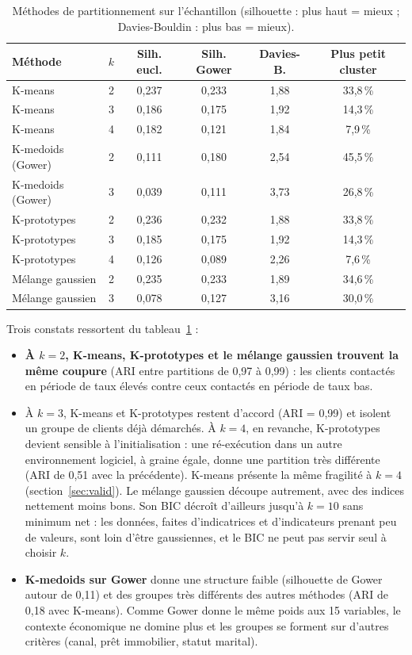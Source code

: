 \documentclass[11pt,a4paper]{article}
\begin{document}
\begin{table}[H]\centering\small
\caption{Méthodes de partitionnement sur l'échantillon (silhouette : plus haut = mieux ; Davies-Bouldin : plus bas = mieux).}\label{tab:partition}
\begin{tabular}{|l|c|c|c|c|c|}
\hline
\textbf{Méthode} & $k$ & \textbf{Silh. eucl.} & \textbf{Silh. Gower} & \textbf{Davies-B.} & \textbf{Plus petit cluster}\\ \hline
K-means            & 2 & 0,237 & 0,233 & 1,88 & 33,8\,\%\\ \hline
K-means            & 3 & 0,186 & 0,175 & 1,92 & 14,3\,\%\\ \hline
K-means            & 4 & 0,182 & 0,121 & 1,84 & 7,9\,\%\\ \hline
K-medoids (Gower)  & 2 & 0,111 & 0,180 & 2,54 & 45,5\,\%\\ \hline
K-medoids (Gower)  & 3 & 0,039 & 0,111 & 3,73 & 26,8\,\%\\ \hline
K-prototypes       & 2 & 0,236 & 0,232 & 1,88 & 33,8\,\%\\ \hline
K-prototypes       & 3 & 0,185 & 0,175 & 1,92 & 14,3\,\%\\ \hline
K-prototypes       & 4 & 0,126 & 0,089 & 2,26 & 7,6\,\%\\ \hline
Mélange gaussien   & 2 & 0,235 & 0,233 & 1,89 & 34,6\,\%\\ \hline
Mélange gaussien   & 3 & 0,078 & 0,127 & 3,16 & 30,0\,\%\\ \hline
\end{tabular}
\end{table}

Trois constats ressortent du tableau~\ref{tab:partition} :
\begin{itemize}
\item \textbf{À $k=2$, K-means, K-prototypes et le mélange gaussien trouvent la même coupure} (ARI entre partitions de 0,97 à 0,99) : les clients contactés en période de taux élevés contre ceux contactés en période de taux bas.
\item À $k=3$, K-means et K-prototypes restent d'accord (ARI = 0,99) et isolent un groupe de clients déjà démarchés. À $k=4$, en revanche, K-prototypes devient sensible à l'initialisation : une ré-exécution dans un autre environnement logiciel, à graine égale, donne une partition très différente (ARI de 0,51 avec la précédente). K-means présente la même fragilité à $k=4$ (section~\ref{sec:valid}). Le mélange gaussien découpe autrement, avec des indices nettement moins bons. Son BIC décroît d'ailleurs jusqu'à $k=10$ sans minimum net : les données, faites d'indicatrices et d'indicateurs prenant peu de valeurs, sont loin d'être gaussiennes, et le BIC ne peut pas servir seul à choisir $k$.
\item \textbf{K-medoids sur Gower} donne une structure faible (silhouette de Gower autour de 0,11) et des groupes très différents des autres méthodes (ARI de 0,18 avec K-means). Comme Gower donne le même poids aux 15 variables, le contexte économique ne domine plus et les groupes se forment sur d'autres critères (canal, prêt immobilier, statut marital).
\end{itemize}
\end{document}

